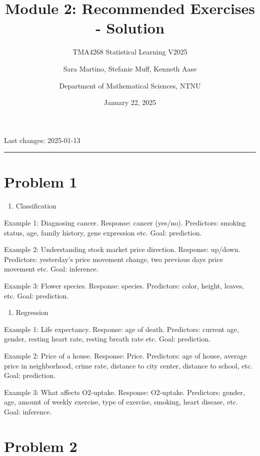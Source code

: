 \documentclass[
]{article}
\title{Module 2: Recommended Exercises - Solution}
\subtitle{TMA4268 Statistical Learning V2025}
\author{Sara Martino, Stefanie Muff, Kenneth Aase \and Department of
Mathematical Sciences, NTNU}
\date{January 22, 2025}
\providecommand{\tightlist}{%
  \setlength{\itemsep}{0pt}\setlength{\parskip}{0pt}}
\begin{document}
\maketitle

Last changes: 2025-01-13

\begin{center}\rule{0.5\linewidth}{0.5pt}\end{center}

\section{Problem 1}\label{problem-1}

\begin{enumerate}
\def\labelenumi{\alph{enumi})}
\tightlist
\item
  Classification
\end{enumerate}

Example 1: Diagnosing cancer. Response: cancer (yes/no). Predictors:
smoking status, age, family history, gene expression etc. Goal:
prediction.

Example 2: Understanding stock market price direction. Response:
up/down. Predictors: yesterday's price movement change, two previous
days price movement etc. Goal: inference.

Example 3: Flower species. Response: species. Predictors: color, height,
leaves, etc. Goal: prediction.

\begin{enumerate}
\def\labelenumi{\alph{enumi})}
\setcounter{enumi}{1}
\tightlist
\item
  Regression
\end{enumerate}

Example 1: Life expectancy. Response: age of death. Predictors: current
age, gender, resting heart rate, resting breath rate etc. Goal:
prediction.

Example 2: Price of a house. Response: Price. Predictors: age of house,
average price in neighborhood, crime rate, distance to city center,
distance to school, etc. Goal: prediction.

Example 3: What affects O2-uptake. Response: O2-uptake. Predictors:
gender, age, amount of weekly exercise, type of exercise, smoking, heart
disease, etc. Goal: inference.

\section{Problem 2}\label{problem-2}
\end{document}
